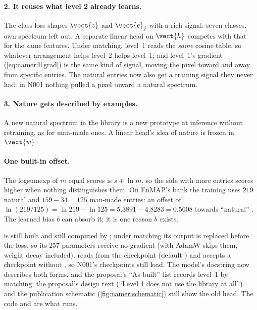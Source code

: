 \paragraph{2. It reuses what level 2 already learns.} The class loss shapes $\vect{z}$ and $\vect{e}_j$ with a rich
signal: seven classes, own spectrum left out. A separate linear head on $\vect{h}$ competes with that for the same
features. Under matching, level~1 reads the \emph{same} cosine table, so whatever arrangement helps level~2 helps level~1;
and level~1's gradient (\cref{eq:namer:l1grad}) is the same kind of signal, moving the pixel toward and away from
specific entries. The natural entries now also get a training signal they never had: in N001 nothing pulled a pixel
toward a natural spectrum.

\paragraph{3. Nature gets described by examples.} A new natural spectrum in the library is a new prototype at
inference without retraining, as for man-made ones. A linear head's idea of nature is frozen in $\vect{w}$.

\paragraph{One built-in offset.} The logsumexp of $m$ equal scores is $s+\ln m$, so the side with more entries scores
higher when nothing distinguishes them. On EnMAP's bank the training uses $219$ natural and $159-34=125$ man-made
entries: an offset of $\ln(219/125)=\ln219-\ln125=5.3891-4.8283=0.5608$ towards ``natural'' \tagC. The learned bias $b$
can absorb it; it is one reason $b$ exists.

\begin{sourcenote}
 is still built and still computed by ; under matching its output is replaced
before the loss, so its 257 parameters receive no gradient (with  AdamW skips them,
weight decay included).  reads  from the checkpoint (default ) and
accepts a checkpoint without , so N001's checkpoints still load. The model's docstring now describes
both forms, and the proposal's ``As built'' list records level~1 by matching; the proposal's design text (``Level 1 does
not use the library at all'') and the publication schematic (\cref{fig:namer:schematic}) still show the old head. The
code and  are what runs.
\end{sourcenote}

